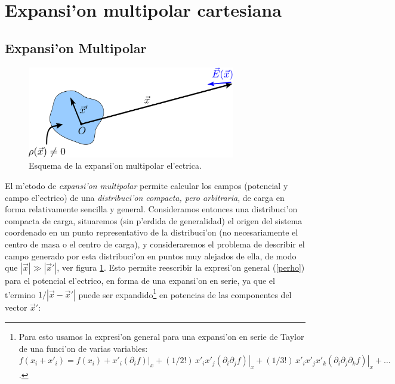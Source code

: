 \section{Expansi'on multipolar cartesiana}
\subsection{Expansi'on Multipolar}
\begin{figure}[!h]
\centerline{\includegraphics[height=4cm]{fig/fig-expansion-multipolar-electrica-01.pdf}}
\caption{Esquema de la expansi'on multipolar el'ectrica.}
\label{fig:emc}
\end{figure}
El m'etodo de {\em expansi'on multipolar} permite calcular los campos (potencial y campo el'ectrico) de una
\textit{distribuci'on compacta, pero arbitraria}, de carga en forma relativamente sencilla y general. Consideramos entonces una distribuci'on compacta de carga, situaremos (sin p'erdida de generalidad) el origen del sistema coordenado en un punto representativo de la distribuci'on (no necesariamente el centro de masa o el centro de carga), y consideraremos el problema de describir el
campo generado por esta distribuci'on en puntos muy alejados de ella, de modo
que $|\vec{x}|\gg|\vec{x}'|$, ver figura \ref{fig:emc}. Esto permite
reescribir la expresi'on general (\ref{perho}) para el potencial
el'ectrico, en forma de una expansi'on en serie, ya
que el t'ermino $1/\left|\vec{x}-\vec{x}'\right|$ puede ser expandido\footnote{Para esto usamos la expresi'on general para una expansi'on en serie de Taylor de una funci'on de varias variables: $f(x_i+x'_i)=f(x_i)+x'_i\left.(\partial_if)\right|_x+(1/2!)\,x'_ix'_j\left.(\partial_i\partial_jf)\right|_x +(1/3!)\,x'_ix'_jx'_k\left.(\partial_i\partial_j\partial_kf)\right|_x+\dots$.}
en potencias de las componentes del vector $\vec{x}'$:
